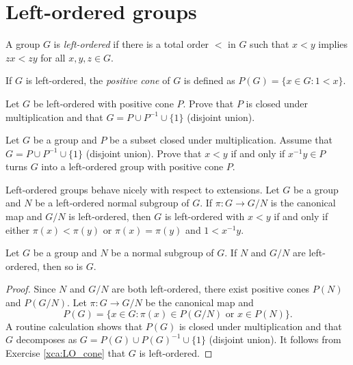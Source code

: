 
\section{Left-ordered groups}

\begin{definition}
	A group $G$ is \emph{left-ordered} if there is a total order 
	$<$ in $G$ such that $x<y$ implies $zx<zy$ for all $x,y,z\in G$.
\end{definition}

If $G$ is left-ordered, the \emph{positive cone} of $G$ is defined as $P(G)=\{x\in G:1<x\}$. 

\begin{exercise}
	Let $G$ be left-ordered with positive cone $P$. Prove that 
	$P$ is closed under multiplication and that 
	$G=P\cup P^{-1}\cup \{1\}$ (disjoint union).
\end{exercise}

\begin{exercise}
\label{xca:LO_cone}
	Let $G$ be a group and $P$ be a subset closed under multiplication. Assume that 
	$G=P\cup P^{-1}\cup \{1\}$ (disjoint union). Prove that $x<y$ if and only if
	$x^{-1}y\in P$ turns $G$ into a left-ordered group with positive cone $P$.
\end{exercise}

Left-ordered groups behave nicely with respect to extensions. Let $G$ be a group
and $N$ be a left-ordered normal subgroup of $G$. If $\pi\colon G\to G/N$ is the 
canonical map and $G/N$ is left-ordered, then
$G$ is left-ordered with
$x<y$ if and only if either $\pi(x)<\pi(y)$ or $\pi(x)=\pi(y)$ and $1<x^{-1}y$. 


\begin{proposition}
	Let $G$ be a group and $N$ be a normal subgroup of $G$. 
	If $N$ and $G/N$ are left-ordered, then so is $G$.
\end{proposition}

\begin{proof}
	Since $N$ and $G/N$ are both left-ordered, there exist positive cones 
	$P(N)$ and $P(G/N)$. Let $\pi\colon G\to G/N$ be the canonical map and 
	\[
		P(G)=\{x\in G:\pi(x)\in P(G/N)\text{ or }x\in P(N)\}.
	\]	
	A routine calculation shows that $P(G)$ is closed under multiplication 
	and that $G$ decomposes as $G=P(G)\cup P(G)^{-1}\cup \{1\}$ (disjoint union). It follows
	from Exercise \ref{xca:LO_cone} that 
	$G$ is left-ordered. 
\end{proof}


